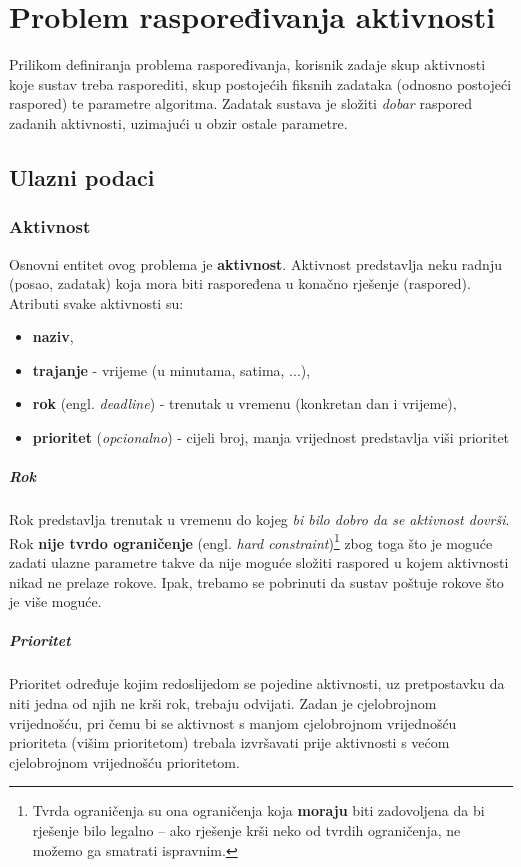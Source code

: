 \documentclass[times, utf8, zavrsni]{fer}
\begin{document}
\chapter{Problem raspoređivanja aktivnosti}\label{definicija}
Prilikom definiranja problema raspoređivanja, korisnik zadaje skup aktivnosti koje sustav treba rasporediti, skup postojećih fiksnih zadataka (odnosno postojeći raspored) te parametre algoritma. Zadatak sustava je složiti \textit{dobar} raspored zadanih aktivnosti, uzimajući u obzir ostale parametre.

\section{Ulazni podaci}\label{ulazni podaci}

\subsection{Aktivnost}
Osnovni entitet ovog problema je \textbf{aktivnost}. Aktivnost predstavlja neku radnju (posao, zadatak) koja mora biti raspoređena u konačno rješenje (raspored). Atributi svake aktivnosti su:
\begin{itemize}
  \item \textbf{naziv},
  \item \textbf{trajanje} - vrijeme (u minutama, satima, ...),
  \item \textbf{rok} (engl. \textit{deadline}) - trenutak u vremenu (konkretan dan i vrijeme),
  \item \textbf{prioritet} (\textit{opcionalno}) - cijeli broj, manja vrijednost predstavlja viši prioritet
\end{itemize}

\paragraph{Rok} Rok predstavlja trenutak u vremenu do kojeg \textit{bi bilo dobro da se aktivnost dovrši}. Rok \textbf{nije tvrdo ograničenje} (engl. \textit{hard constraint})\footnote{Tvrda ograničenja su ona ograničenja koja \textbf{moraju} biti zadovoljena da bi rješenje bilo legalno -- ako rješenje krši neko od tvrdih ograničenja, ne možemo ga smatrati ispravnim.} zbog toga što je moguće zadati ulazne parametre takve da nije moguće složiti raspored u kojem aktivnosti nikad ne prelaze rokove. Ipak, trebamo se pobrinuti da sustav poštuje rokove što je više moguće.

\paragraph{Prioritet} Prioritet određuje kojim redoslijedom se pojedine aktivnosti, uz pretpostavku da niti jedna od njih ne krši rok, trebaju odvijati. Zadan je cjelobrojnom vrijednošću, pri čemu bi se aktivnost s manjom cjelobrojnom vrijednošću prioriteta (višim prioritetom) trebala izvršavati prije aktivnosti s većom cjelobrojnom vrijednošću prioritetom.
\end{document}
